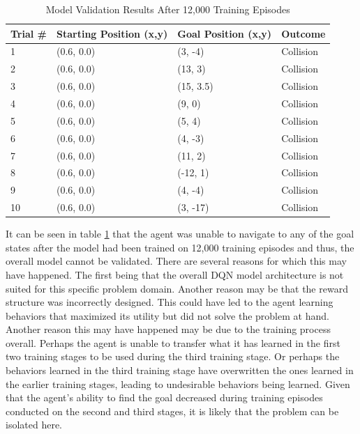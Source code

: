 \documentclass[conference]{IEEEtran}
\begin{document}
\begin{table}[h!]
\begin{tabular}{|l|l|l|l|}
\hline
\textbf{Trial \#} & \textbf{Starting Position (x,y)} & \textbf{Goal Position (x,y)} & \textbf{Outcome} \\ \hline
1                 & (0.6, 0.0)                       & (3, -4)                      & Collision        \\ \hline
2                 & (0.6, 0.0)                       & (13, 3)                      & Collision        \\ \hline
3                 & (0.6, 0.0)                       & (15, 3.5)                    & Collision        \\ \hline
4                 & (0.6, 0.0)                       & (9, 0)                       & Collision        \\ \hline
5                 & (0.6, 0.0)                       & (5, 4)                       & Collision        \\ \hline
6                 & (0.6, 0.0)                       & (4, -3)                      & Collision        \\ \hline
7                 & (0.6, 0.0)                       & (11, 2)                      & Collision        \\ \hline
8                 & (0.6, 0.0)                       & (-12, 1)                     & Collision        \\ \hline
9                 & (0.6, 0.0)                       & (4, -4)                      & Collision        \\ \hline
10                & (0.6, 0.0)                       & (3, -17)                     & Collision        \\ \hline
\end{tabular}
\caption{Model Validation Results After 12,000 Training Episodes}
\label{tab:resTable2}
\end{table}

It can be seen in table \ref{tab:resTable2} that the agent was unable to navigate to any of the goal states after the model had been trained on 12,000 training episodes and thus, the overall model cannot be validated. There are several reasons for which this may have happened. The first being that the overall DQN model architecture is not suited for this specific problem domain. Another reason may be that the reward structure was incorrectly designed. This could have led to the agent learning behaviors that maximized its utility but did not solve the problem at hand. Another reason this may have happened may be due to the training process overall. Perhaps the agent is unable to transfer what it has learned in the first two training stages to be used during the third training stage. Or perhaps the behaviors learned in the third training stage have overwritten the ones learned in the earlier training stages, leading to undesirable behaviors being learned. Given that the agent's ability to find the goal decreased during training episodes conducted on the second and third stages, it is likely that the problem can be isolated here. 
\end{document}
